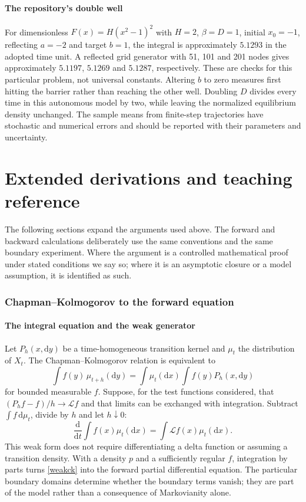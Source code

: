 \documentclass[11pt,a4paper]{article}
\newcommand{\dd}{\mathrm d}
\newcommand{\Lop}{\mathcal L}
\theoremstyle{remark}\newtheorem*{remark}{Physical interpretation}
\begin{document}
\subsection{The repository's double well}
For dimensionless $F(x)=H(x^2-1)^2$ with $H=2$, $\beta=D=1$, initial $x_0=-1$, reflecting $a=-2$ and target $b=1$, the integral is approximately $5.1293$ in the adopted time unit. A reflected grid generator with 51, 101 and 201 nodes gives approximately $5.1197$, $5.1269$ and $5.1287$, respectively. These are checks for this particular problem, not universal constants. Altering $b$ to zero measures first hitting the barrier rather than reaching the other well. Doubling $D$ divides every time in this autonomous model by two, while leaving the normalized equilibrium density unchanged. The sample means from finite-step trajectories have stochastic and numerical errors and should be reported with their parameters and uncertainty.

\clearpage
\part*{Extended derivations and teaching reference}
The following sections expand the arguments used above. The forward and backward calculations deliberately use the same conventions and the same boundary experiment. Where the argument is a controlled mathematical proof under stated conditions we say so; where it is an asymptotic closure or a model assumption, it is identified as such.

\section{Chapman--Kolmogorov to the forward equation}
\subsection{The integral equation and the weak generator}
Let $P_h(x,\dd y)$ be a time-homogeneous transition kernel and $\mu_t$ the distribution of $X_t$. The Chapman--Kolmogorov relation is equivalent to
\begin{equation}
\int f(y)\,\mu_{t+h}(\dd y)=\int \mu_t(\dd x)\int f(y)P_h(x,\dd y)
\end{equation}
for bounded measurable $f$. Suppose, for the test functions considered, that $(P_hf-f)/h\to\Lop f$ and that limits can be exchanged with integration. Subtract $\int f\,\dd\mu_t$, divide by $h$ and let $h\downarrow0$:
\begin{equation}\label{weakck}
\frac{\dd}{\dd t}\int f(x)\mu_t(\dd x)=\int \Lop f(x)\mu_t(\dd x).
\end{equation}
This weak form does not require differentiating a delta function or assuming a transition density. With a density $p$ and a sufficiently regular $f$, integration by parts turns \eqref{weakck} into the forward partial differential equation. The particular boundary domains determine whether the boundary terms vanish; they are part of the model rather than a consequence of Markovianity alone.
\end{document}
